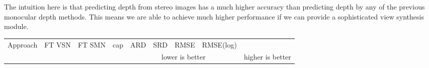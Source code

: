\documentclass[10pt,twocolumn,letterpaper]{article}
\begin{document}
The intuition here is that predicting depth from stereo images has a much higher accuracy than predicting depth by any of the previous monocular depth methods. This means we are able to achieve much higher performance if we can provide a sophisticated view synthesis module.


\begin{table*}[tp]
\centering
	\begin{adjustbox}{max width=1.0\textwidth}
	\begin{tabular}{@{}l|c|c|c|cccc|ccc@{}}
	\toprule
\multicolumn{1}{l|}{Approach} & \multicolumn{1}{c|}{FT VSN} & \multicolumn{1}{c|}{FT SMN}& \multicolumn{1}{c|}{cap} & ARD   & SRD   & RMSE   & RMSE(log)   &  &  &  \\ \cline{5-11} 
                             &               & &           & \multicolumn{4}{c|}{lower is better} & \multicolumn{3}{c}{higher is better} \\ \midrule


\end{tabular}
\end{adjustbox}
\end{table*}
\end{document}
